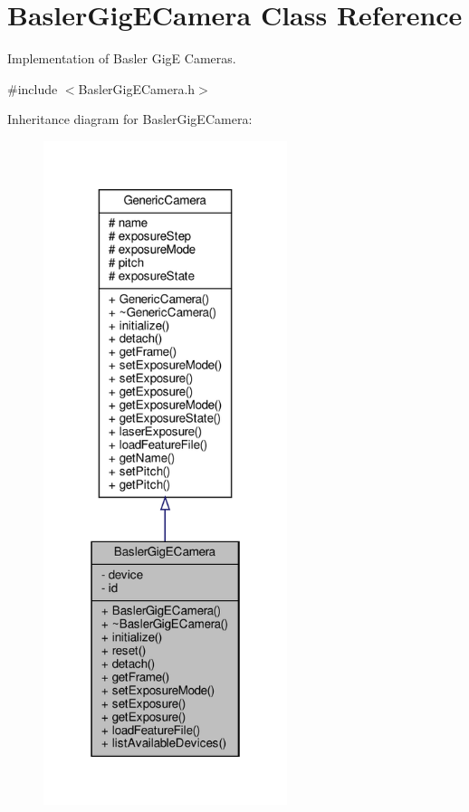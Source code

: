 \hypertarget{class_basler_gig_e_camera}{}\section{Basler\+Gig\+E\+Camera Class Reference}
\label{class_basler_gig_e_camera}


Implementation of Basler GigE Cameras.  




{\ttfamily \#include $<$Basler\+Gig\+E\+Camera.\+h$>$}



Inheritance diagram for Basler\+Gig\+E\+Camera\+:\nopagebreak
\begin{figure}[H]
\begin{center}
\leavevmode
\includegraphics[height=550pt]{class_basler_gig_e_camera__inherit__graph}
\end{center}
\end{figure}


